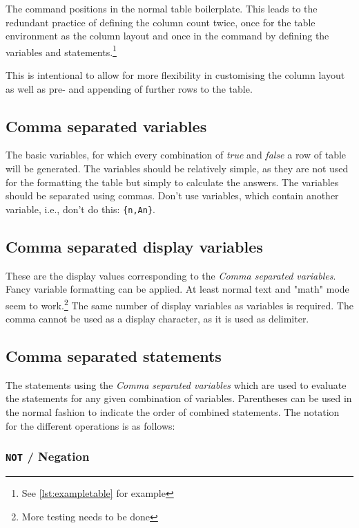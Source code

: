\documentclass[a4paper]{article}
\begin{document}
The command positions in the normal table boilerplate. This leads to the redundant practice of defining the column count twice, once for the table environment as the column layout and once in the command by defining the variables and statements.\footnote{See \autoref{lst:exampletable} for example}

This is intentional to allow for more flexibility in customising the column layout as well as pre- and appending of further rows to the table.

\subsection{Comma separated variables}

The basic variables, for which every combination of \emph{true} and \emph{false} a row of table will be generated. The variables should be relatively simple, as they are not used for the formatting the table but simply to calculate the answers. The variables should be separated using commas. Don't use variables, which contain another variable, i.e., don't do this: \texttt{\{n,An\}}.

\subsection{Comma separated display variables}

These are the display values corresponding to the \emph{Comma separated variables}. Fancy variable formatting can be applied. At least normal text and "math" mode seem to work.\footnote{More testing needs to be done}
The same number of display variables as variables is required. The comma cannot be used as a display character, as it is used as delimiter.

\subsection{Comma separated statements}

The statements using the \emph{Comma separated variables} which are used to evaluate the statements for any given combination of variables. Parentheses can be used in the normal fashion to indicate the order of combined statements. The notation for the different operations is as follows:

\subsubsection{\texttt{NOT} / Negation}
\end{document}
